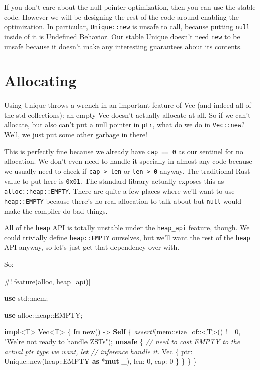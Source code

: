 \documentclass[a4paper,]{book}
\newenvironment{Shaded}{\begin{snugshade}}{\end{snugshade}}
\newcommand{\KeywordTok}[1]{\textcolor[rgb]{0.13,0.29,0.53}{\textbf{{#1}}}}
\newcommand{\DataTypeTok}[1]{\textcolor[rgb]{0.13,0.29,0.53}{{#1}}}
\newcommand{\DecValTok}[1]{\textcolor[rgb]{0.00,0.00,0.81}{{#1}}}
\newcommand{\StringTok}[1]{\textcolor[rgb]{0.31,0.60,0.02}{{#1}}}
\newcommand{\CommentTok}[1]{\textcolor[rgb]{0.56,0.35,0.01}{\textit{{#1}}}}
\newcommand{\PreprocessorTok}[1]{\textcolor[rgb]{0.56,0.35,0.01}{\textit{{#1}}}}
\newcommand{\AttributeTok}[1]{\textcolor[rgb]{0.77,0.63,0.00}{{#1}}}
\newcommand{\NormalTok}[1]{{#1}}
\begin{document}
If you don't care about the null-pointer optimization, then you can use
the stable code. However we will be designing the rest of the code
around enabling the optimization. In particular, \texttt{Unique::new} is
unsafe to call, because putting \texttt{null} inside of it is Undefined
Behavior. Our stable Unique doesn't need \texttt{new} to be unsafe
because it doesn't make any interesting guarantees about its contents.

\section{Allocating}\label{sec--vec-alloc}

Using Unique throws a wrench in an important feature of Vec (and indeed
all of the std collections): an empty Vec doesn't actually allocate at
all. So if we can't allocate, but also can't put a null pointer in
\texttt{ptr}, what do we do in \texttt{Vec::new}? Well, we just put some
other garbage in there!

This is perfectly fine because we already have \texttt{cap\ ==\ 0} as
our sentinel for no allocation. We don't even need to handle it
specially in almost any code because we usually need to check if
\texttt{cap\ \textgreater{}\ len} or \texttt{len\ \textgreater{}\ 0}
anyway. The traditional Rust value to put here is \texttt{0x01}. The
standard library actually exposes this as \texttt{alloc::heap::EMPTY}.
There are quite a few places where we'll want to use
\texttt{heap::EMPTY} because there's no real allocation to talk about
but \texttt{null} would make the compiler do bad things.

All of the \texttt{heap} API is totally unstable under the
\texttt{heap\_api} feature, though. We could trivially define
\texttt{heap::EMPTY} ourselves, but we'll want the rest of the
\texttt{heap} API anyway, so let's just get that dependency over with.

So:

\begin{Shaded}
\begin{Highlighting}[]
\AttributeTok{#![}\NormalTok{feature}\AttributeTok{(}\NormalTok{alloc}\AttributeTok{,} \NormalTok{heap_api}\AttributeTok{)]}

\KeywordTok{use} \NormalTok{std::mem;}

\KeywordTok{use} \NormalTok{alloc::heap::EMPTY;}

\KeywordTok{impl}\NormalTok{<T> }\DataTypeTok{Vec}\NormalTok{<T> \{}
    \KeywordTok{fn} \NormalTok{new() -> }\KeywordTok{Self} \NormalTok{\{}
        \PreprocessorTok{assert!}\NormalTok{(mem::size_of::<T>() != }\DecValTok{0}\NormalTok{, }\StringTok{"We're not ready to handle ZSTs"}\NormalTok{);}
        \KeywordTok{unsafe} \NormalTok{\{}
            \CommentTok{// need to cast EMPTY to the actual ptr type we want, let}
            \CommentTok{// inference handle it.}
            \DataTypeTok{Vec} \NormalTok{\{ ptr: Unique::new(heap::EMPTY }\KeywordTok{as} \NormalTok{*}\KeywordTok{mut} \NormalTok{_), len: }\DecValTok{0}\NormalTok{, cap: }\DecValTok{0} \NormalTok{\}}
        \NormalTok{\}}
    \NormalTok{\}}
\NormalTok{\}}
\end{Highlighting}
\end{Shaded}
\end{document}
